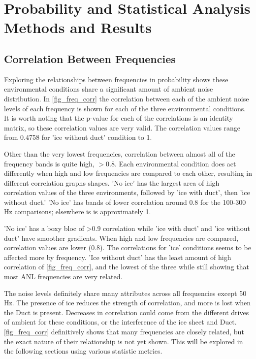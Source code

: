 \section{Probability and Statistical Analysis Methods and Results}

\subsection{Correlation Between Frequencies} \label{sec_corr_freq}

Exploring the relationships between frequencies in probability shows these environmental conditions share a significant amount of ambient noise distribution. In \autoref{fig_freq_corr} the correlation between each of the ambient noise levels of each frequency is shown for each of the three environmental conditions. It is worth noting that the p-value for each of the correlations is an identity matrix, so these correlation values are very valid. The correlation values range from 0.4758 for 'ice without duct' condition to 1. 

Other than the very lowest frequencies, correlation between almost all of the frequency bands is quite high, $>0.8$.  Each environmental condition does act differently when high and low frequencies are compared to each other, resulting in different correlation graphs shapes. 'No ice' has the largest area of high correlation values of the three environments, followed by 'ice with duct', then 'ice without duct.' 'No ice' has bands of lower correlation around 0.8 for the 100-300 Hz comparisons; elsewhere is is approximately 1.

'No ice' has a boxy bloc of >0.9 correlation while 'ice with duct' and 'ice without duct' have smoother gradients. When high and low frequencies are compared, correlation values are lower (0.8). The correlations for 'ice' conditions seems to be affected more by frequency. 'Ice without duct' has the least amount of high correlation of \autoref{fig_freq_corr}, and the lowest of the three while still showing that most ANL frequencies are very related.

The noise levels definitely share many attributes across all frequencies except 50 Hz. The presence of ice reduces the strength of correlation, and more is lost when the Duct is present. Decreases in correlation could come from the different drives of ambient for these conditions, or the interference of the ice sheet and Duct. \autoref{fig_freq_corr} definitively shows that many frequencies are closely related, but the exact nature of their relationship is not yet shown. This will be explored in the following sections using various statistic metrics. 

